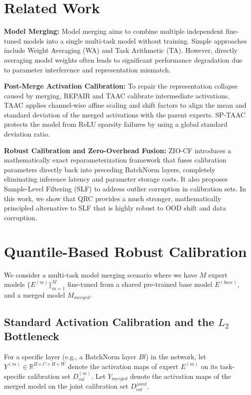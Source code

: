 \documentclass{article}
\theoremstyle{plain}
\theoremstyle{definition}
\theoremstyle{remark}
\begin{document}
\section{Related Work}
\label{sec:related}

\textbf{Model Merging:} Model merging aims to combine multiple independent fine-tuned models into a single multi-task model without training. Simple approaches include Weight Averaging (WA) and Task Arithmetic (TA). However, directly averaging model weights often leads to significant performance degradation due to parameter interference and representation mismatch.

\textbf{Post-Merge Activation Calibration:} To repair the representation collapse caused by merging, REPAIR \cite{repair2022} and TAAC \cite{taac2026} calibrate intermediate activations. TAAC applies channel-wise affine scaling and shift factors to align the mean and standard deviation of the merged activations with the parent experts. SP-TAAC \cite{sptaac2026} protects the model from ReLU sparsity failures by using a global standard deviation ratio.

\textbf{Robust Calibration and Zero-Overhead Fusion:} ZIO-CF \cite{ziocf2026} introduces a mathematically exact reparameterization framework that fuses calibration parameters directly back into preceding BatchNorm layers, completely eliminating inference latency and parameter storage costs. It also proposes Sample-Level Filtering (SLF) to address outlier corruption in calibration sets. In this work, we show that QRC provides a much stronger, mathematically principled alternative to SLF that is highly robust to OOD shift and data corruption.

\section{Quantile-Based Robust Calibration}
\label{sec:method}

We consider a multi-task model merging scenario where we have $M$ expert models $\{E^{(m)}\}_{m=1}^M$ fine-tuned from a shared pre-trained base model $E^{(base)}$, and a merged model $M_{merged}$.

\subsection{Standard Activation Calibration and the $L_2$ Bottleneck}
For a specific layer (e.g., a BatchNorm layer $Bl$) in the network, let $Y^{(m)} \in \mathbb{R}^{B \times C \times H \times W}$ denote the activation maps of expert $E^{(m)}$ on its task-specific calibration set $D^{(m)}_{cal}$. Let $Y_{merged}$ denote the activation maps of the merged model on the joint calibration set $D^{joint}_{cal}$.
\end{document}
